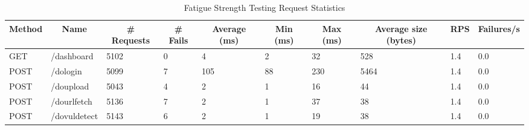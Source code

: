 \begin{table*}[h]
  \caption{Fatigue Strength Testing Request Statistics}
  \label{tab:fstreqstat}
  \begin{tabular}{|l|l|l|l|l|l|l|l|l|l|}
    \hline
    \multicolumn{1}{|c|}{\textbf{Method}} & \multicolumn{1}{c|}{\textbf{Name}} & \multicolumn{1}{c|}{\textbf{\# Requests}} & \multicolumn{1}{c|}{\textbf{\# Fails}} & \multicolumn{1}{c|}{\textbf{Average (ms)}} & \multicolumn{1}{c|}{\textbf{Min (ms)}} & \multicolumn{1}{c|}{\textbf{Max (ms)}} & \multicolumn{1}{c|}{\textbf{Average size (bytes)}} & \multicolumn{1}{c|}{\textbf{RPS}} & \multicolumn{1}{c|}{\textbf{Failures/s}} \\ \hline
    GET                                   & /dashboard                         & 5102                                      & 0                                      & 4                                          & 2                                      & 32                                     & 528                                                & 1.4                               & 0.0                                      \\ \hline
    POST                                  & /dologin                           & 5099                                      & 7                                      & 105                                        & 88                                     & 230                                    & 5464                                               & 1.4                               & 0.0                                      \\ \hline
    POST                                  & /doupload                          & 5043                                      & 4                                      & 2                                          & 1                                      & 16                                     & 44                                                 & 1.4                               & 0.0                                      \\ \hline
    POST                                  & /dourlfetch                        & 5136                                      & 7                                      & 2                                          & 1                                      & 37                                     & 38                                                 & 1.4                               & 0.0                                      \\ \hline
    POST                                  & /dovuldetect                       & 5143                                      & 6                                      & 2                                          & 1                                      & 19                                     & 38                                                 & 1.4                               & 0.0                                      \\ \hline

\end{tabular}
\end{table*}
